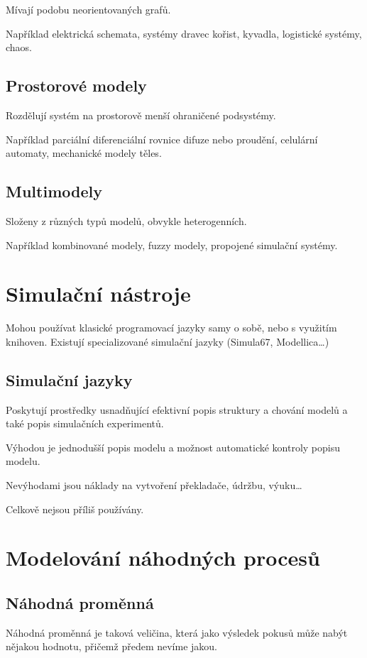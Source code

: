 \documentclass[11pt]{article}
\begin{document}
Mívají podobu neorientovaných grafů.

Například elektrická schemata, systémy dravec kořist, kyvadla, logistické
systémy, chaos.

\subsection{Prostorové modely}
\label{sec:orge30362d}
Rozdělují systém na prostorově menší ohraničené podsystémy.

Například parciální diferenciální rovnice difuze nebo proudění, celulární
automaty, mechanické modely těles.

\subsection{Multimodely}
\label{sec:org07bd3a8}
Složeny z různých typů modelů, obvykle heterogenních.

Například kombinované modely, fuzzy modely, propojené simulační systémy.
\section{Simulační nástroje}
\label{sec:org3b4330c}
Mohou používat klasické programovací jazyky samy o sobě, nebo s využitím
knihoven. Existují specializované simulační jazyky (Simula67, Modellica\ldots{})

\subsection{Simulační jazyky}
\label{sec:org7e78be1}
Poskytují prostředky usnadňující efektivní popis struktury a chování modelů a
také popis simulačních experimentů.

Výhodou je jednodušší popis modelu a možnost automatické kontroly popisu modelu.

Nevýhodami jsou náklady na vytvoření překladače, údržbu, výuku\ldots{}

Celkově nejsou příliš používány.

\section{Modelování náhodných procesů}
\label{sec:orgdef9d6c}
\subsection{Náhodná proměnná}
\label{sec:orgbf929cb}
Náhodná proměnná je taková veličina, která jako výsledek pokusů může nabýt
nějakou hodnotu, přičemž předem nevíme jakou.
\end{document}
